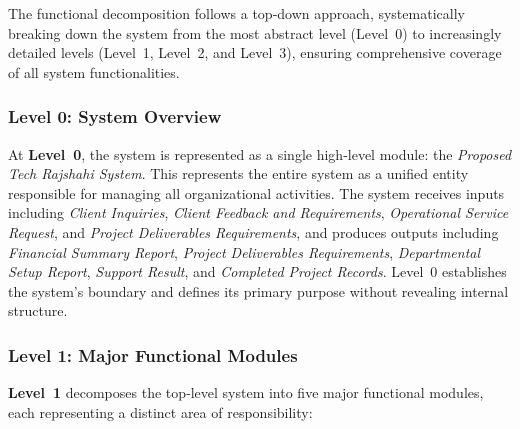 \documentclass[12pt,a4paper]{article}
\begin{document}
The functional decomposition follows a top‑down approach, systematically breaking down the system from the most abstract level (Level~0) to increasingly detailed levels (Level~1, Level~2, and Level~3), ensuring comprehensive coverage of all system functionalities.

\subsubsection{Level 0: System Overview}
At \textbf{Level~0}, the system is represented as a single high‑level module: the \textit{Proposed Tech Rajshahi System}.  This represents the entire system as a unified entity responsible for managing all organizational activities.  The system receives inputs including \textit{Client Inquiries}, \textit{Client Feedback and Requirements}, \textit{Operational Service Request}, and \textit{Project Deliverables Requirements}, and produces outputs including \textit{Financial Summary Report}, \textit{Project Deliverables Requirements}, \textit{Departmental Setup Report}, \textit{Support Result}, and \textit{Completed Project Records}.  Level~0 establishes the system's boundary and defines its primary purpose without revealing internal structure.

\subsubsection{Level 1: Major Functional Modules}
\textbf{Level~1} decomposes the top‑level system into five major functional modules, each representing a distinct area of responsibility:
\end{document}
